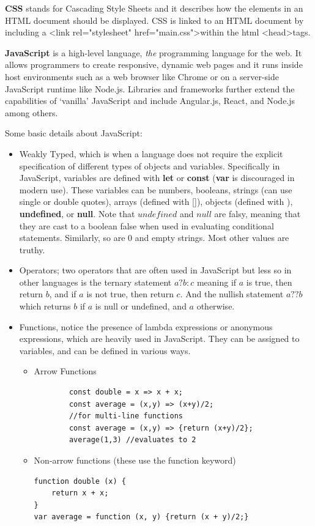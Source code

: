 \documentclass{article}
\begin{document}
\textbf{CSS} stands for Cascading Style Sheets and it describes how the elements in an HTML document should be displayed. CSS is linked to an HTML document by including a \textless link rel="stylesheet" href="main.css"\textgreater within the html \textless head\textgreater tags.

\textbf{JavaScript} is a high-level language, \textit{the} programming language for the web. It allows programmers to create responsive, dynamic web pages and it runs inside host environments such as a web browser like Chrome or on a server-side JavaScript runtime like Node.js. Libraries and frameworks further extend the capabilities of `vanilla' JavaScript and include Angular.js, React, and Node.js among others.

Some basic details about JavaScript:
\begin{itemize}
    \item Weakly Typed, which is when a language does not require the explicit specification of different types of objects and variables. Specifically in JavaScript, variables are defined with \textbf{let} or \textbf{const} (\textbf{var} is discouraged in modern use). These variables can be numbers, booleans, strings (can use single or double quotes), arrays (defined with []), objects (defined with {}), \textbf{undefined}, or \textbf{null}. Note that $undefined$ and $null$ are falsy, meaning that they are cast to a boolean false when used in evaluating conditional statements. Similarly, so are 0 and empty strings. Most other values are truthy. 
    \item Operators; two operators that are often used in JavaScript but less so in other languages is the ternary statement $a ? b : c$ meaning if $a$ is true, then return $b$, and if $a$ is not true, then return $c$. And the nullish statement $a ?? b$ which returns $b$ if $a$ is null or undefined, and $a$ otherwise.
    \item Functions, notice the presence of lambda expressions or anonymous expressions, which are heavily used in JavaScript. They can be assigned to variables, and can be defined in various ways.
    \begin{itemize}
        \item Arrow Functions
\begin{tcolorbox}
    \begin{verbatim}
        const double = x => x + x;
        const average = (x,y) => (x+y)/2;
        //for multi-line functions
        const average = (x,y) => {return (x+y)/2}; 
        average(1,3) //evaluates to 2
    \end{verbatim}
\end{tcolorbox}
\item Non-arrow functions (these use the function keyword)
\begin{tcolorbox}
    \begin{verbatim}
function double (x) {
    return x + x;
}
var average = function (x, y) {return (x + y)/2;}
    \end{verbatim}
\end{tcolorbox}    
\end{itemize}
\end{itemize}
\end{document}
